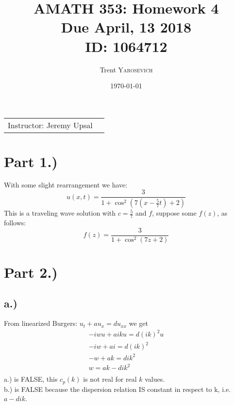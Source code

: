 \documentclass{article}
\title{AMATH 353: Homework 4 \\Due April, 13 2018 \\ ID: 1064712} %
\author{Trent \textsc{Yarosevich}} %
\date{\today} %
\begin{document}
\maketitle %
\setlength\parindent{1cm}

\begin{center}
\begin{tabular}{l r}
Instructor: Jeremy Upsal %
\end{tabular}
\end{center}


\section*{Part 1.)} 
With some slight rearrangement we have:
\begin{equation}
u(x,t) = \frac{3}{1 + \cos^2(7(x -\frac{5}{7}t) +2)}
\end{equation}
This is a traveling wave solution with $c = \frac{5}{7}$ and $f$, suppose some $f(z)$, as follows:
\begin{equation}
f(z) = \frac{3}{1 + \cos^2(7z +2)}
\end{equation}
\section*{Part 2.)}
\subsection*{a.)}
From linearized Burgers: $u_t + au_x = du_{xx}$ we get
\begin{equation}
\begin{aligned}
-iwu + aiku = d(ik)^2u\\
-iw + ai = d(ik)^2\\
-w + ak = dik^2\\
w = ak-dik^2\\
\end{aligned}
\end{equation}
a.) is FALSE, this $c_p(k)$ is not real for real $k$ values.\\
b.) is FALSE because the dispersion relation IS constant in respect to k, i.e. $a-dik$.
\end{document}
